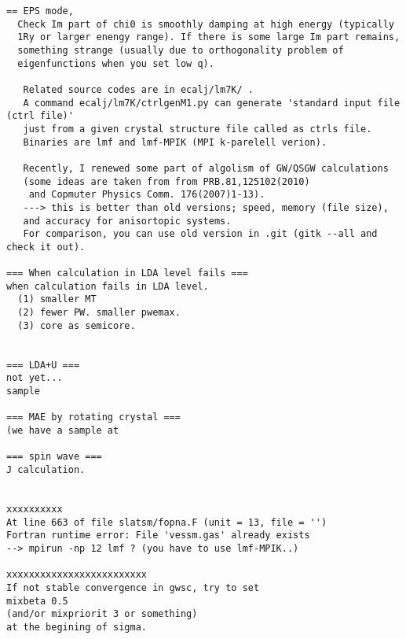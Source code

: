 \documentclass[a4paper,10pt,epsf,fleqn]{article}
\begin{document}
\begin{verbatim}
== EPS mode,
  Check Im part of chi0 is smoothly damping at high energy (typically
  1Ry or larger enengy range). If there is some large Im part remains,
  something strange (usually due to orthogonality problem of
  eigenfunctions when you set low q).

   Related source codes are in ecalj/lm7K/ .
   A command ecalj/lm7K/ctrlgenM1.py can generate 'standard input file (ctrl file)' 
   just from a given crystal structure file called as ctrls file. 
   Binaries are lmf and lmf-MPIK (MPI k-parelell verion).

   Recently, I renewed some part of algolism of GW/QSGW calculations
   (some ideas are taken from from PRB.81,125102(2010) 
    and Copmuter Physics Comm. 176(2007)1-13).
   ---> this is better than old versions; speed, memory (file size),
   and accuracy for anisortopic systems.
   For comparison, you can use old version in .git (gitk --all and check it out).

=== When calculation in LDA level fails ===
when calculation fails in LDA level.
  (1) smaller MT
  (2) fewer PW. smaller pwemax.
  (3) core as semicore.


=== LDA+U ===
not yet...
sample

=== MAE by rotating crystal ===
(we have a sample at

=== spin wave ===
J calculation.


xxxxxxxxxx
At line 663 of file slatsm/fopna.F (unit = 13, file = '')
Fortran runtime error: File 'vessm.gas' already exists
--> mpirun -np 12 lmf ? (you have to use lmf-MPIK..)

xxxxxxxxxxxxxxxxxxxxxxxxx
If not stable convergence in gwsc, try to set
mixbeta 0.5
(and/or mixpriorit 3 or something)
at the begining of sigma.


\end{verbatim}
\end{document}
